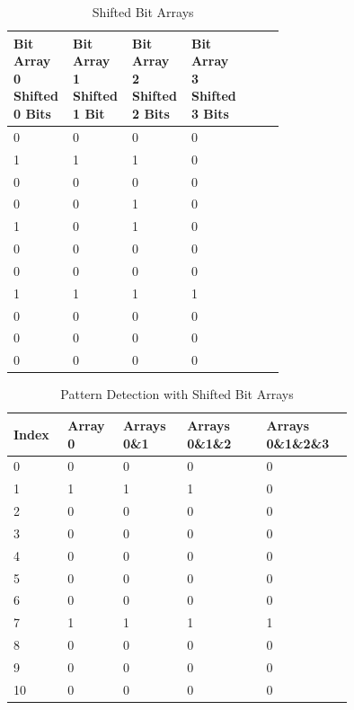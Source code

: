 \documentclass[doublespace,nopageskip]{VTthesis}
\begin{document}
\begin{table}[htb]
	\centering
	\caption{Shifted Bit Arrays}
	\begin{tabular}{p{0.12\linewidth}p{0.12\linewidth}p{0.12\linewidth}p{0.12\linewidth}p{0.12\linewidth}}
	    \toprule
	    Bit Array 0 Shifted 0 Bits & Bit Array 1 Shifted 1 Bit & Bit Array 2 Shifted 2 Bits & Bit Array 3 Shifted 3 Bits\\
	    \midrule
	    0 & 0 & 0 & 0 \\
	    \midrule
	    1 & 1 & 1 & 0 \\
	    \midrule
	    0 & 0 & 0 & 0 \\
	    \midrule
	    0 & 0 & 1 & 0 \\
	    \midrule
	    1 & 0 & 1 & 0 \\
	    \midrule
	    0 & 0 & 0 & 0 \\
	    \midrule
	    0 & 0 & 0 & 0 \\
	    \midrule
	    1 & 1 & 1 & 1 \\
	    \midrule
	    0 & 0 & 0 & 0 \\
	    \midrule
	    0 & 0 & 0 & 0 \\
	    \midrule
	    0 & 0 & 0 & 0 \\
	    \bottomrule
	\end{tabular}
	\label{tab:shifted_bit_arrays}
\end{table}

\begin{table}[htb]
	\centering
	\caption{Pattern Detection with Shifted Bit Arrays}
	\begin{tabular}{p{0.1\linewidth}p{0.1\linewidth}p{0.15\linewidth}p{0.2\linewidth}p{0.2\linewidth}}
	    \toprule
	    Index & Array 0 & Arrays 0\&1 & Arrays 0\&1\&2 & Arrays 0\&1\&2\&3 \\
	    \midrule
	    0 & 0 & 0 & 0 & 0 \\
	    \midrule
	    1 & 1 & 1 & 1 & 0 \\
	    \midrule
	    2 & 0 & 0 & 0 & 0 \\
	    \midrule
	    3 & 0 & 0 & 0 & 0 \\
	    \midrule
	    4 & 0 & 0 & 0 & 0 \\
	    \midrule
	    5 & 0 & 0 & 0 & 0 \\
	    \midrule
	    6 & 0 & 0 & 0 & 0 \\
	    \midrule
	    7 & 1 & 1 & 1 & 1 \\
	    \midrule
	    8 & 0 & 0 & 0 & 0 \\
	    \midrule
	    9 & 0 & 0 & 0 & 0 \\
	    \midrule
	    10 & 0 & 0 & 0 & 0 \\
	    \bottomrule
	\end{tabular}
	\label{tab:pattern_detection_with_arrays}
\end{table}
\end{document}
